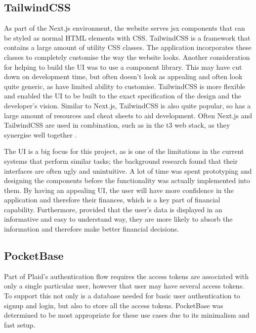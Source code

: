\subsection{TailwindCSS}
As part of the Next.js environment, the website serves jsx components that can be styled as normal HTML elements with CSS. TailwindCSS is a framework that contains a large amount of utility CSS classes. The application incorporates these classes to completely customise the way the website looks. Another consideration for helping to build the UI was to use a component library. This may have cut down on development time, but often doesn't look as appealing and often look quite generic, as have limited ability to customise. TailwindCSS is more flexible and enabled the UI to be built to the exact specification of the design and the developer's vision. Similar to Next.js, TailwindCSS is also quite popular, so has a large amount of resources and cheat sheets to aid development. Often Next.js and TailwindCSS are used in combination, such as in the t3 web stack, as they synergise well together \cite{T3Stack}.

The UI is a big focus for this project, as is one of the limitations in the current systems that perform similar tasks; the background research found that their interfaces are often ugly and unintuitive. A lot of time was spent prototyping and designing the components before the functionality was actually implemented into them. By having an appealing UI, the user will have more confidence in the application and therefore their finances, which is a key part of financial capability. Furthermore, provided that the user's data is displayed in an informative and easy to understand way, they are more likely to absorb the information and therefore make better financial decisions.

\subsection{PocketBase}
Part of Plaid's authentication flow requires the access tokens are associated with only a single particular user, however that user may have several access tokens. To support this not only is a database needed for basic user authentication to signup and login, but also to store all the access tokens. PocketBase was determined to be most appropriate for these use cases due to its minimalism and fast setup.

